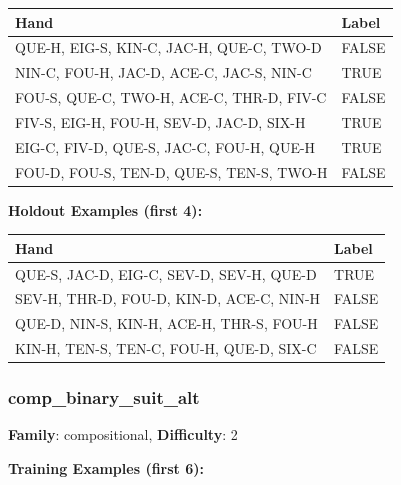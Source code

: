 \documentclass[10pt,a4paper]{article}
\begin{document}
\begin{small}
\begin{tabular}{p{8cm}l}
\toprule
Hand & Label \\
\midrule
QUE-H, EIG-S, KIN-C, JAC-H, QUE-C, TWO-D & \textcolor{negative}{FALSE} \\
NIN-C, FOU-H, JAC-D, ACE-C, JAC-S, NIN-C & \textcolor{positive}{TRUE} \\
FOU-S, QUE-C, TWO-H, ACE-C, THR-D, FIV-C & \textcolor{negative}{FALSE} \\
FIV-S, EIG-H, FOU-H, SEV-D, JAC-D, SIX-H & \textcolor{positive}{TRUE} \\
EIG-C, FIV-D, QUE-S, JAC-C, FOU-H, QUE-H & \textcolor{positive}{TRUE} \\
FOU-D, FOU-S, TEN-D, QUE-S, TEN-S, TWO-H & \textcolor{negative}{FALSE} \\
\bottomrule
\end{tabular}
\end{small}

\textbf{Holdout Examples (first 4):}

\begin{small}
\begin{tabular}{p{8cm}l}
\toprule
Hand & Label \\
\midrule
QUE-S, JAC-D, EIG-C, SEV-D, SEV-H, QUE-D & \textcolor{positive}{TRUE} \\
SEV-H, THR-D, FOU-D, KIN-D, ACE-C, NIN-H & \textcolor{negative}{FALSE} \\
QUE-D, NIN-S, KIN-H, ACE-H, THR-S, FOU-H & \textcolor{negative}{FALSE} \\
KIN-H, TEN-S, TEN-C, FOU-H, QUE-D, SIX-C & \textcolor{negative}{FALSE} \\
\bottomrule
\end{tabular}
\end{small}

\vspace{0.5cm}

\subsubsection{comp\_binary\_suit\_alt}

\textbf{Family}: compositional, \textbf{Difficulty}: 2

\textbf{Training Examples (first 6):}
\end{document}
